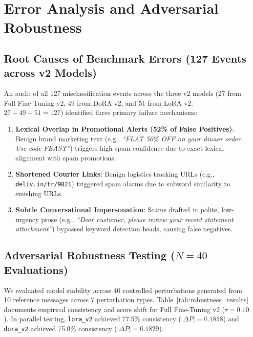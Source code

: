 \documentclass[conference]{IEEEtran}
\begin{document}
\section{Error Analysis and Adversarial Robustness}
\label{sec:error_analysis}

\subsection{Root Causes of Benchmark Errors (127 Events across v2 Models)}
An audit of all 127 misclassification events across the three v2 models (27 from Full Fine-Tuning v2, 49 from DoRA v2, and 51 from LoRA v2; $27+49+51=127$) identified three primary failure mechanisms:
\begin{enumerate}
    \item \textbf{Lexical Overlap in Promotional Alerts (52\% of False Positives)}: Benign brand marketing text (e.g., \textit{``FLAT 50\% OFF on your dinner order. Use code FEAST''}) triggers high spam confidence due to exact lexical alignment with spam promotions.
    \item \textbf{Shortened Courier Links}: Benign logistics tracking URLs (e.g., \texttt{deliv.in/tr/9821}) triggered spam alarms due to subword similarity to smishing URLs.
    \item \textbf{Subtle Conversational Impersonation}: Scams drafted in polite, low-urgency prose (e.g., \textit{``Dear customer, please review your recent statement attachment''}) bypassed keyword detection heads, causing false negatives.
\end{enumerate}

\subsection{Adversarial Robustness Testing ($N=40$ Evaluations)}
We evaluated model stability across 40 controlled perturbations generated from 10 reference messages across 7 perturbation types. Table~\ref{tab:robustness_results} documents empirical consistency and score shift for Full Fine-Tuning v2 ($\tau=0.10$). In parallel testing, \texttt{lora\_v2} achieved 77.5\% consistency ($|\Delta P| = 0.1858$) and \texttt{dora\_v2} achieved 75.0\% consistency ($|\Delta P| = 0.1829$).
\end{document}

